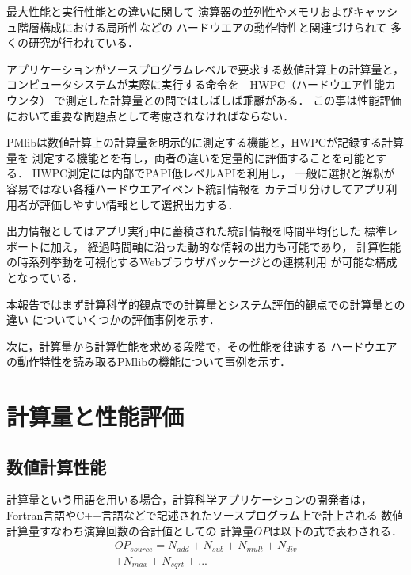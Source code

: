 \documentclass[submit,techrep,noauthor]{ipsj}
\begin{document}
最大性能と実行性能との違いに関して
演算器の並列性やメモリおよびキャッシュ階層構成における局所性などの
ハードウエアの動作特性と関連づけられて
多くの研究が行われている．

アプリケーションがソースプログラムレベルで要求する数値計算上の計算量と，
コンピュータシステムが実際に実行する命令を　HWPC（ハードウエア性能カウンタ）
で測定した計算量との間ではしばしば乖離がある．
この事は性能評価において重要な問題点として考慮されなければならない．

PMlibは数値計算上の計算量を明示的に測定する機能と，HWPCが記録する計算量を
測定する機能とを有し，両者の違いを定量的に評価することを可能とする．
HWPC測定には内部でPAPI低レベルAPIを利用し，
一般に選択と解釈が容易ではない各種ハードウエアイベント統計情報を
カテゴリ分けしてアプリ利用者が評価しやすい情報として選択出力する．

出力情報としてはアプリ実行中に蓄積された統計情報を時間平均化した
標準レポートに加え，
経過時間軸に沿った動的な情報の出力も可能であり，
計算性能の時系列挙動を可視化するWebブラウザパッケージとの連携利用
が可能な構成となっている．

本報告ではまず計算科学的観点での計算量とシステム評価的観点での計算量との違い
についていくつかの評価事例を示す．

次に，計算量から計算性能を求める段階で，その性能を律速する
ハードウエアの動作特性を読み取るPMlibの機能について事例を示す．



\section {計算量と性能評価}
\label{section:computing-volume}

\subsection {数値計算性能}
\label{subsection:scientific-perf}
計算量という用語を用いる場合，計算科学アプリケーションの開発者は，
Fortran言語やC++言語などで記述されたソースプログラム上で計上される
数値計算量すなわち演算回数の合計値としての
計算量\begin{math} OP \end{math}は以下の式で表わされる．
\begin{align*}
OP_{source} = N_{add} + N_{sub} + N_{mult} + N_{div} \\
	+ N_{max} + N_{sqrt} + ...
\end{align*}
\end{document}
